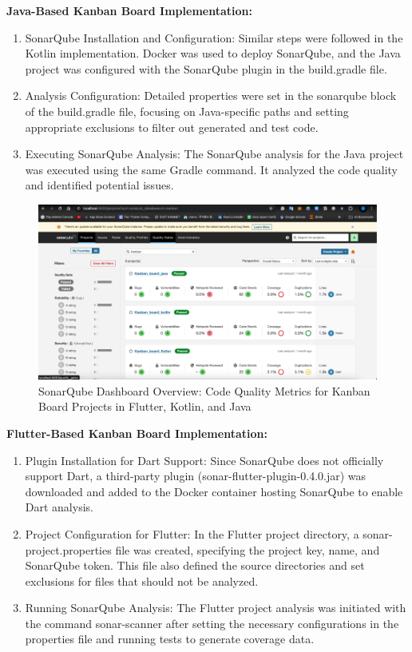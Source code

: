 \textbf{Java-Based Kanban Board Implementation:}
\begin{enumerate}
    \item SonarQube Installation and Configuration: Similar steps were followed in the Kotlin implementation. Docker was used to deploy SonarQube, and the Java project was configured with the SonarQube plugin in the build.gradle file.
    \item Analysis Configuration: Detailed properties were set in the sonarqube block of the build.gradle file, focusing on Java-specific paths and setting appropriate exclusions to filter out generated and test code.
    \item Executing SonarQube Analysis: The SonarQube analysis for the Java project was executed using the same Gradle command. It analyzed the code quality and identified potential issues.
\end{enumerate}
\begin{figure}[htbp]
    \centering
    \includegraphics[scale = 1]{img/sonarqube_dashboard.png}
    \caption{SonarQube Dashboard Overview: Code Quality Metrics for Kanban Board Projects in Flutter, Kotlin, and Java}
    \label{fig:sonarqube_dashboard}
\end{figure}
\textbf{Flutter-Based Kanban Board Implementation:}
\begin{enumerate}
    \item Plugin Installation for Dart Support: Since SonarQube does not officially support Dart, a third-party plugin (sonar-flutter-plugin-0.4.0.jar) was downloaded and added to the Docker container hosting SonarQube to enable Dart analysis.
    \item Project Configuration for Flutter: In the Flutter project directory, a sonar-project.properties file was created, specifying the project key, name, and SonarQube token. This file also defined the source directories and set exclusions for files that should not be analyzed.
    \item Running SonarQube Analysis: The Flutter project analysis was initiated with the command sonar-scanner after setting the necessary configurations in the properties file and running tests to generate coverage data.
\end{enumerate}

